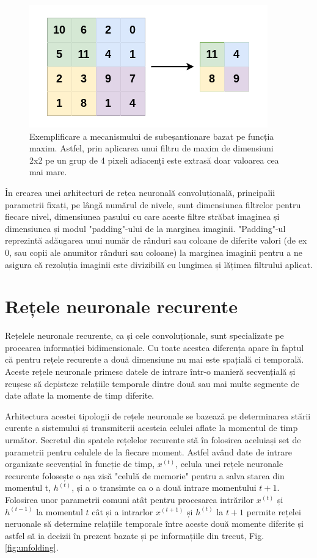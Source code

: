 \documentclass[a4paper,12pt]{book}
\begin{document}
				\begin{figure}[t]
					\centering
					\includegraphics[scale=0.80]{maxpool}
					\caption{Exemplificare a mecanismului de subeșantionare bazat pe funcția maxim. Astfel, prin aplicarea unui filtru de maxim de dimensiuni 2x2 pe un grup de 4 pixeli adiacenți este extrasă doar valoarea cea mai mare.} 
					\label{fig:maxpool}
				\end{figure} 
				 
				 În crearea unei arhitecturi de rețea neuronală convoluțională, principalii parametrii fixați, pe lângă numărul de nivele, sunt dimensiunea filtrelor pentru fiecare nivel, dimensiunea pasului cu care aceste filtre străbat imaginea și dimensiunea și modul "padding"-ului de la marginea imaginii. "Padding"-ul reprezintă adăugarea unui număr de rânduri sau coloane de diferite valori (de ex 0, sau copii ale anumitor rânduri sau coloane) la marginea imaginii pentru a ne asigura că rezoluția imaginii este divizibilă cu lungimea și lățimea filtrului aplicat.
				
			\section{Rețele neuronale recurente} \label{RNN}
				
				Rețelele neuronale recurente, ca și cele convoluționale, sunt specializate pe procearea informației bidimensionale. Cu toate acestea diferența apare în faptul că pentru rețele recurente a două dimensiune nu mai este spațială ci temporală. Aceste rețele neuronale primesc datele de intrare într-o manieră secvențială și reușesc să depisteze relațiile temporale dintre două sau mai multe segmente de date aflate la momente de timp diferite. \par
				
				Arhitectura acestei tipologii de rețele neuronale se bazează pe determinarea stării curente a sistemului și transmiterii acesteia celulei aflate la momentul de timp următor. Secretul din spatele rețelelor recurente stă în folosirea aceluiași set de parametrii pentru celulele de la fiecare moment. Astfel având date de intrare organizate secvențial în funcție de timp, $x^{(t)}$, celula unei rețele neuronale recurente folosește o așa zisă "celulă de memorie" pentru a salva starea din momentul t, $h^{(t)}$, și a o transimte ca o a două intrare momentului $t+1$. Folosirea unor parametrii comuni atât pentru procesarea intrărilor $x^{(t)}$ și $h^{(t-1)}$ la momentul $t$ cât și a intrarlor $x^{(t+1)}$ și $h^{(t)}$ la $t+1$ permite rețelei neruonale să determine relațiile temporale între aceste două momente diferite și astfel să ia decizii în prezent bazate și pe informațiile din trecut, Fig. \ref{fig:unfolding}. 
				
\end{document}
